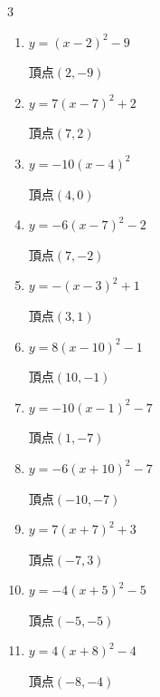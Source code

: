 \begin{multicols}{3}
\begin{enumerate}
        $\displaystyle 頂点\left( 6 , -7 \right)$

  \item $\displaystyle y=\left( x-2\right)^{2}-9$

        $\displaystyle 頂点\left( 2 , -9 \right)$

\columnbreak %

  \item $\displaystyle y=7\left( x-7\right)^{2}+2$

        $\displaystyle 頂点\left( 7 , 2 \right)$

  \item $\displaystyle y=-10\left( x-4\right)^{2}$

        $\displaystyle 頂点\left( 4 , 0 \right)$

  \item $\displaystyle y=-6\left( x-7\right)^{2}-2$

        $\displaystyle 頂点\left( 7 , -2 \right)$

  \item $\displaystyle y=-\left( x-3\right)^{2}+1$

        $\displaystyle 頂点\left( 3 , 1 \right)$

  \item $\displaystyle y=8\left( x-10\right)^{2}-1$

        $\displaystyle 頂点\left( 10 , -1 \right)$

  \item $\displaystyle y=-10\left( x-1\right)^{2}-7$

        $\displaystyle 頂点\left( 1 , -7 \right)$

  \item $\displaystyle y=-6\left( x+10\right)^{2}-7$

        $\displaystyle 頂点\left( -10 , -7 \right)$

  \item $\displaystyle y=7\left( x+7\right)^{2}+3$

        $\displaystyle 頂点\left( -7 , 3 \right)$

  \item $\displaystyle y=-4\left( x+5\right)^{2}-5$

        $\displaystyle 頂点\left( -5 , -5 \right)$

  \item $\displaystyle y=4\left( x+8\right)^{2}-4$

        $\displaystyle 頂点\left( -8 , -4 \right)$


\end{enumerate}
\end{multicols}
